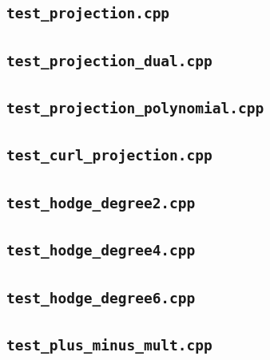 \documentclass[11pt]{article}
\begin{document}
\subsection{\verb|test_projection.cpp|}
\subsection{\verb|test_projection_dual.cpp|}
\subsection{\verb|test_projection_polynomial.cpp|}
\subsection{\verb|test_curl_projection.cpp|}
\subsection{\verb|test_hodge_degree2.cpp|}
\subsection{\verb|test_hodge_degree4.cpp|}
\subsection{\verb|test_hodge_degree6.cpp|}
\subsection{\verb|test_plus_minus_mult.cpp|}
\end{document}
